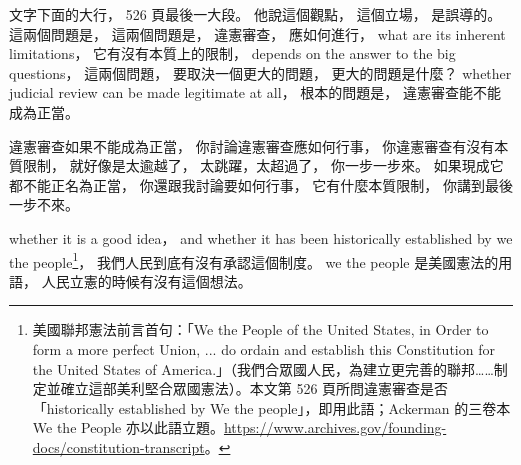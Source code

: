 \hypertarget{w02:cue:707}{}文字下面的大行，
\hypertarget{w02:cue:708}{}526 頁最後一大段。
\hypertarget{w02:cue:709}{}他說這個觀點，
\hypertarget{w02:cue:710}{}這個立場，
\hypertarget{w02:cue:711}{}是誤導的。
\hypertarget{w02:cue:712}{}這兩個問題是，
\hypertarget{w02:cue:713}{}這兩個問題是，
\hypertarget{w02:cue:714}{}違憲審查，
\hypertarget{w02:cue:715}{}應如何進行，
\hypertarget{w02:cue:716}{}what are its inherent limitations，
\hypertarget{w02:cue:717}{}它有沒有本質上的限制，
\hypertarget{w02:cue:718}{}depends on the answer to the big questions，
\hypertarget{w02:cue:719}{}這兩個問題，
\hypertarget{w02:cue:720}{}要取決一個更大的問題，
\hypertarget{w02:cue:721}{}更大的問題是什麼？
\hypertarget{w02:cue:722}{}whether judicial review can be made legitimate at all，
\hypertarget{w02:cue:723}{}根本的問題是，
\hypertarget{w02:cue:724}{}違憲審查能不能成為正當。

\hypertarget{w02:cue:725}{}違憲審查如果不能成為正當，
\hypertarget{w02:cue:726}{}你討論違憲審查應如何行事，
\hypertarget{w02:cue:727}{}你違憲審查有沒有本質限制，
\hypertarget{w02:cue:728}{}就好像是太逾越了，
\hypertarget{w02:cue:729}{}太跳躍，太超過了，
\hypertarget{w02:cue:730}{}你一步一步來。
\hypertarget{w02:cue:731}{}如果現成它都不能正名為正當，
\hypertarget{w02:cue:732}{}你還跟我討論要如何行事，
\hypertarget{w02:cue:733}{}它有什麼本質限制，
\hypertarget{w02:cue:734}{}你講到最後一步不來。

\hypertarget{w02:cue:735}{}whether it is a good idea，
\hypertarget{w02:cue:736}{}and whether it has been historically established by we the people\footnote{美國聯邦憲法前言首句：「We the People of the United States, in Order to form a more perfect Union, ... do ordain and establish this Constitution for the United States of America.」（我們合眾國人民，為建立更完善的聯邦……制定並確立這部美利堅合眾國憲法）。本文第 526 頁所問違憲審查是否「historically established by We the people」，即用此語；Ackerman 的三卷本 We the People 亦以此語立題。\url{https://www.archives.gov/founding-docs/constitution-transcript}。}，
\hypertarget{w02:cue:737}{}我們人民到底有沒有承認這個制度。
\hypertarget{w02:cue:738}{}we the people 是美國憲法的用語，
\hypertarget{w02:cue:739}{}人民立憲的時候有沒有這個想法。

